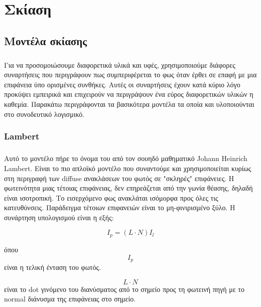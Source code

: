 \chapter{Σκίαση}

\begin{sloppypar}

\section{Μοντέλα σκίασης}
\paragraph{}
	Για να προσομοιώσουμε διαφορετικά υλικά και υφές, χρησιμοποιούμε διάφορες συναρτήσεις που
περιγράφουν πως συμπεριφέρεται το φως όταν έρθει σε επαφή με μια επιφάνεια ύπο ορισμένες συνθήκες.
Αυτές οι συναρτήσεις έχουν κατά κύριο λόγο προκύψει εμπειρικά και επιχειρούν να περιγράψουν ένα
εύρος διαφορετικών υλικών η καθεμία. Παρακάτω περιγράφονται τα βασικότερα μοντέλα τα οποία και 
υλοποιούνται στο συνοδευτικό λογισμικό.

\subsection{Lambert}
\paragraph{}
	Αυτό το μοντέλο πήρε το όνομα του από τον σουηδό μαθηματικό Johann Heinrich Lambert. Είναι το πιο
απλοϊκό μοντέλο που συναντούμε και χρησιμοποιείται κυρίως στη περιγραφή των diffuse ανακλάσεων του φωτός
σε "σκληρές" επιφάνειες. Η φωτεινότητα μιας τέτοιας επιφάνειας, δεν επηρεάζεται από την γωνία θέασης, 
δηλαδή είναι ισοτροπική. Το εισερχόμενο φως ανακλάται ισόμορφα προς όλες τις κατευθύνσεις.
Παράδειγμα τέτοιων επιφανειών είναι το μη-φινιρισμένο ξύλο. Η συνάρτηση υπολογισμού είναι η εξής:

\begin{equation}
I_p =  (L \cdot N) I_l
\end{equation}

όπου\\

\begin{equation}
I_p
\end{equation}
είναι η τελική ένταση του φωτός.

\begin{equation}
L \cdot N
\end{equation}
είναι το dot γινόμενο του διανύσματος από το σημείο προς τη φωτεινή πηγή με το normal διάνυσμα της επιφάνειας στο σημείο.


\end{sloppypar}
